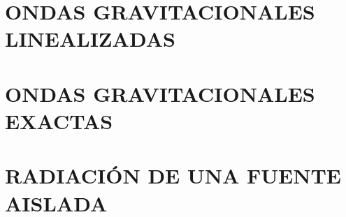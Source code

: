 \documentclass[../main]{subfiles}
\begin{document}
\chapter{ONDAS GRAVITACIONALES LINEALIZADAS}

\newpage


\chapter{ONDAS GRAVITACIONALES EXACTAS}

\newpage


\chapter{RADIACIÓN DE UNA FUENTE AISLADA}

\newpage
\end{document}
